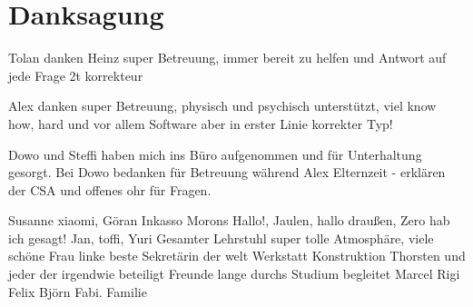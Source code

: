 \chapter{Danksagung}
Tolan danken
Heinz super Betreuung, immer bereit zu helfen und Antwort auf jede Frage
2t korrekteur

Alex danken super Betreuung, physisch und psychisch unterstützt, viel know how, hard und vor allem Software aber in erster Linie korrekter Typ!

Dowo und Steffi haben mich ins Büro aufgenommen und für Unterhaltung gesorgt. Bei Dowo bedanken für Betreuung während Alex Elternzeit - erklären der CSA und offenes ohr für Fragen.

Susanne xiaomi, Göran Inkasso Morons 
Hallo!, Jaulen, hallo draußen, Zero hab ich gesagt!
Jan, toffi, Yuri
Gesamter Lehrstuhl super tolle Atmosphäre, viele schöne 
Frau linke beste Sekretärin der welt
Werkstatt Konstruktion Thorsten und jeder der irgendwie beteiligt
Freunde lange durchs Studium begleitet Marcel Rigi Felix Björn Fabi.
Familie

